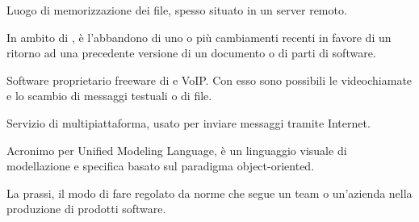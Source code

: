 Luogo di memorizzazione dei file, spesso situato in un server remoto.

In ambito di , è l'abbandono di uno o più cambiamenti recenti in favore di un ritorno ad una precedente versione di un documento o di parti di software.
\clearpage

Software proprietario freeware di  e VoIP. Con esso sono possibili le videochiamate e lo scambio di messaggi testuali o di file.
\clearpage

Servizio di  multipiattaforma, usato per inviare messaggi tramite Internet.
\clearpage

Acronimo per Unified Modeling Language, è un linguaggio visuale di modellazione e specifica basato sul paradigma object-oriented.

\clearpage

La prassi, il modo di fare regolato da norme che segue un team o un'azienda nella produzione di prodotti software.

\clearpage



